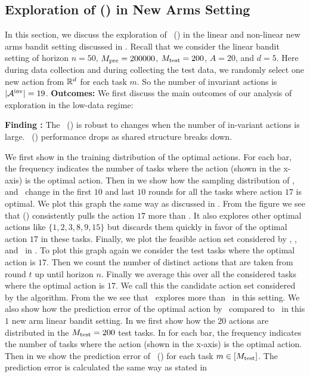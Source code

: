\documentclass[10pt]{article}
\theoremstyle{plain}
\theoremstyle{definition}
\theoremstyle{remark}
\newcounter{findingcounter}
\newcommand{\customfinding}[1][\normalfont]{\stepcounter{findingcounter}\textbf{Finding \thefindingcounter:}#1 }
\begin{document}
\subsection{Exploration of \pred (\gt) in New Arms Setting}
\label{sec:new-arms-app}
In this section, we discuss the exploration of \pred\ (\gt) in the linear and non-linear new arms bandit setting discussed in .  Recall that we consider the linear bandit setting of horizon $n=50$, $M_{\text{pre}} = 200000$, $M_{\text{test}} = 200$, $A=20$, and $d=5$.
Here during data collection and during collecting the test data, we randomly select one new action from $\mathbb{R}^d$ for each task $m$.
So the number of invariant actions is $|\mathcal{A}^{\text{inv}}| = 19$.
\textbf{Outcomes:} We first discuss the main outcomes of our analysis of exploration in the low-data regime:
\begin{tcolorbox}
    \customfinding The \pred\ (\gt) is robust to changes when the number of in-variant actions is large. \pred\ (\gt) performance drops as shared structure breaks down.
\end{tcolorbox}
We first show in  the training distribution of the optimal actions. For each bar, the frequency indicates the number of tasks where the action (shown in the x-axis) is the optimal action.
Then in  we show how the sampling distribution of \dptg, \pred\, and \predt\ change in the first $10$ and last $10$ rounds for all the tasks where action $17$ is optimal. We plot this graph the same way as discussed in .
From the figure  we see that \pred (\gt) consistently pulls the action $17$ more than \dptg. It also explores other optimal actions like $\{1,2,3,8,9,15\}$ but discards them quickly in favor of the optimal action $17$ in these tasks.
Finally, we plot the feasible action set considered by \dptg, \pred, and \predt\ in . To plot this graph again we consider the test tasks where the optimal action is $17$. Then we count the number of distinct actions that are taken from round $t$ up until horizon $n$. Finally we average this over all the considered tasks where the optimal action is $17$. We call this the candidate action set considered by the algorithm. From the  we see that \predt\ explores more than \pred\ in this setting.
We also show how the prediction error of the optimal action by \pred\ compared to \linucb\ in this $1$ new arm linear bandit setting. In  we first show how the $20$ actions are distributed in the $M_{\text{test}}=200$ test tasks. In  for each bar, the frequency indicates the number of tasks where the action (shown in the x-axis) is the optimal action. Then in  we show the prediction error of \pred\ (\gt) for each task $m\in[M_{\text{test}}]$. The prediction error is calculated the same way as stated in 
\end{document}
